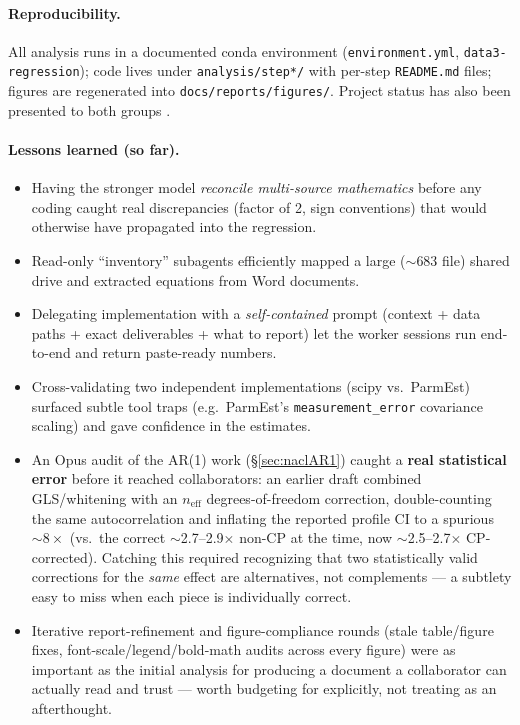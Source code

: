 \documentclass[11pt]{article}
\begin{document}
\paragraph{Reproducibility.} All analysis runs in a documented conda environment
(\texttt{environment.yml}, \texttt{data3-regression}); code lives under
\texttt{analysis/step*/} with per-step \texttt{README.md} files; figures are
regenerated into \texttt{docs/reports/figures/}. Project status has also been
presented to both groups
\cite{data3presentation2026,iconPoster2026,phillipLabUpdate2026}.

\paragraph{Lessons learned (so far).}
\begin{itemize}[itemsep=2pt]
  \item Having the stronger model \emph{reconcile multi-source mathematics} before
        any coding caught real discrepancies (factor of 2, sign conventions) that
        would otherwise have propagated into the regression.
  \item Read-only ``inventory'' subagents efficiently mapped a large ($\sim$683
        file) shared drive and extracted equations from Word documents.
  \item Delegating implementation with a \emph{self-contained} prompt (context +
        data paths + exact deliverables + what to report) let the worker sessions
        run end-to-end and return paste-ready numbers.
  \item Cross-validating two independent implementations (scipy vs.\ ParmEst)
        surfaced subtle tool traps (e.g.\ ParmEst's \texttt{measurement\_error}
        covariance scaling) and gave confidence in the estimates.
  \item An Opus audit of the AR(1) work (\S\ref{sec:naclAR1}) caught a
        \textbf{real statistical error} before it reached collaborators: an
        earlier draft combined GLS/whitening with an $n_{\mathrm{eff}}$
        degrees-of-freedom correction, double-counting the same
        autocorrelation and inflating the reported profile CI to a
        spurious $\sim\!8\times$ (vs.\ the correct $\sim$2.7--2.9$\times$
        non-CP at the time, now $\sim$2.5--2.7$\times$ CP-corrected).
        Catching this required recognizing that two statistically valid
        corrections for the \emph{same} effect are alternatives, not
        complements --- a subtlety easy to miss when each piece is
        individually correct.
  \item Iterative report-refinement and figure-compliance rounds (stale
        table/figure fixes, font-scale/legend/bold-math audits across every
        figure) were as important as the initial analysis for producing a
        document a collaborator can actually read and trust --- worth
        budgeting for explicitly, not treating as an afterthought.
\end{itemize}
\end{document}
